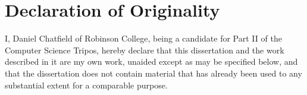 \documentclass[final,dissertation.tex]{subfiles}
\begin{document}
  \chapter*{Declaration of Originality}

  I, Daniel Chatfield of Robinson College, being a candidate for Part II of the Computer Science Tripos, hereby declare that this dissertation and the work described in it are my own work, unaided except as may be specified below, and that the dissertation does not contain material that has already been used to any substantial extent for a comparable purpose.

  \vspace{4cm}

  \par\noindent\makebox[2.5in]{\hrulefill} \hfill\makebox[2.0in]{\hrulefill}%
  \par\noindent{}      \hfill{}%
\end{document}
